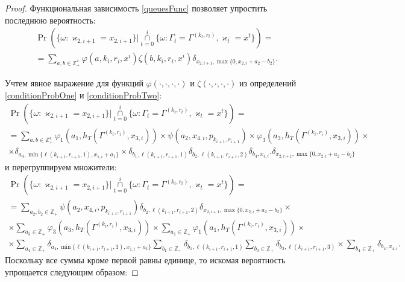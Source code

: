 \documentclass[a4paper,12pt,russian]{extarticle}
\begin{document}
\begin{proof}
Функциональная зависимость \eqref{queuesFunc} позволяет упростить последнюю вероятность:
\begin{multline*}
\Pr (\{ \omega \colon \varkappa_{2,i+1} = x_{2,i+1}\} |\mathop{\cap}\limits_{t=0}^{i}\{\omega\colon \Gamma_t=\Gamma^{(k_t,r_t)}, \varkappa_t=x^t\}) =\\
=\sum_{a,b\in \mathbb{Z}_+^4} \varphi(a,k_i,r_i,x^i)\zeta(b,k_i,r_i,x^i)  \delta_{x_{2,i+1},\max\{0,x_{2,i}+a_2-b_2\}}.
\end{multline*}

Учтем явное выражение для функций $\varphi(\cdot, \cdot, \cdot, \cdot)$ и $\zeta(\cdot, \cdot, \cdot, \cdot)$ из определений \eqref{conditionProbOne} и \eqref{conditionProbTwo}:
\begin{multline*}
\Pr (\{ \omega \colon \varkappa_{2,i+1} = x_{2,i+1}\} |\mathop{\cap}\limits_{t=0}^{i}\{\omega\colon \Gamma_t=\Gamma^{(k_t,r_t)}, \varkappa_t=x^t\}) =\\
=  \sum_{a,b\in \mathbb{Z}_+^4} \varphi_1(a_1,h_T(\Gamma^{(k_i,r_i)},x_{3,i})) \times \psi(a_2,x_{4,i}, p_{k_{i+1},r_{i+1}})  \times \varphi_3(a_3,h_T(\Gamma^{(k_i,r_i)},x_{3,i})) \times \\ \times \delta_{a_4,\min{\{\ell(k_{i+1},r_{i+1},1), x_{1,i}+a_1}\}} \times \delta_{b_1,\ell(k_{i+1},r_{i+1},1)} \delta_{b_2,\ell(k_{i+1},r_{i+1},2)} 
\delta_{b_4,x_{4,i}}. \delta_{x_{2,i+1},\max\{0,x_{2,i}+a_2-b_2\}} 
\end{multline*}
и перегруппируем множители:
\begin{multline*}
\Pr (\{ \omega \colon \varkappa_{2,i+1} = x_{2,i+1}\} |\mathop{\cap}\limits_{t=0}^{i}\{\omega\colon \Gamma_t=\Gamma^{(k_t,r_t)}, \varkappa_t=x^t\}) =\\
= \sum_{a_2,b_2\in \mathbb{Z}_+}\psi(a_2,x_{4,i}, p_{k_{i+1},r_{i+1}})  \delta_{b_2,\ell(k_{i+1},r_{i+1},2)}   \delta_{x_{2,i+1},\max\{0,x_{2,i}+a_2-b_2\}} \times \\ 
\times \sum_{a_3\in \mathbb{Z}_+} \varphi_3(a_3,h_T(\Gamma^{(k_i,r_i)},x_{3,i})) \times \sum_{a_1\in \mathbb{Z}_+} \varphi_1(a_1,h_T(\Gamma^{(k_i,r_i)},x_{3,i})) \times \\ 
\times \sum_{a_4\in \mathbb{Z}_+} \delta_{a_4,\min{\{\ell(k_{i+1},r_{i+1},1), x_{1,i}+a_1}\}} \sum_{b_1\in \mathbb{Z}_+} \delta_{b_1,\ell(k_{i+1},r_{i+1},1)} \sum_{b_3\in \mathbb{Z}_+} \delta_{b_3,\ell(k_{i+1},r_{i+1},3)} 
\times \sum_{b_4\in \mathbb{Z}_+}  \delta_{b_4,x_{4,i}}.
\end{multline*}
Поскольку все суммы кроме первой равны единице, то искомая вероятность упрощается следующим образом:

\end{proof}
\end{document}
